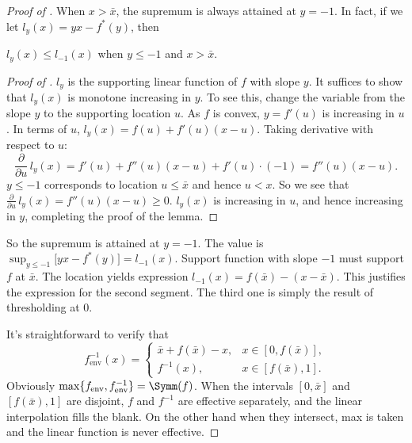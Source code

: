 \begin{proof}[Proof of ]
	When $x>\bar{x}$, the supremum is always attained at $y=-1$. In fact, if we let $l_y(x) = y x-f^*(y)$, then
	\begin{lemma} \label{lem:ning}
	 	$l_y(x)\leqslant l_{-1}(x)$ when $y\leqslant -1$ and $x>\bar{x}$.
	\end{lemma}
	\begin{proof}[Proof of ]
	$l_y$ is the supporting linear function of $f$ with slope $y$. It suffices to show that $l_y(x)$ is monotone increasing in $y$. To see this, change the variable from the slope $y$ to the supporting location $u$. As $f$ is convex, $y=f'(u)$ is increasing in $u$. In terms of $u$, $l_y(x) = f(u) + f'(u)(x-u)$. Taking derivative with respect to $u$:
	\[\frac{\partial}{\partial u }\, l_y(x) = f'(u) + f''(u)(x-u) + f'(u)\cdot(-1) = f''(u)(x-u).\]
	$y\leqslant -1$ corresponds to location $u\leqslant \bar{x}$ and hence $u<x$. So we see that $\frac{\partial}{\partial u }\, l_y(x)= f''(u)(x-u) \geqslant 0$. $l_y(x)$ is increasing in $u$, and hence increasing in $y$, completing the proof of the lemma.
	\end{proof}
	So the supremum is attained at $y=-1$. The value is $\sup_{y\leqslant -1}\big[yx-f^*(y)\big] = l_{-1}(x)$. Support function with slope $-1$ must support $f$ at $\bar{x}$.
	The location yields expression $l_{-1}(x) = f(\bar{x}) - (x-\bar{x})$. This justifies the expression for the second segment. The third one is simply the result of thresholding at 0.

	It's straightforward to verify that
	\[
		f_\mathrm{env}^{-1}(x) =
		\left\{
		\begin{array}{ll}
		\bar{x}+f(\bar{x})-x,&x\in[0,f(\bar{x})], \\
		f^{-1}(x), & x\in[f(\bar{x}),1].
		\end{array}
		\right.
	\]
	Obviously $\max\{{f}_\mathrm{env},{f}_\mathrm{env}^{-1}\}=\Symm(f)$. When the intervals $[0,\bar{x}]$ and $[f(\bar{x}),1]$ are disjoint, $f$ and $f^{-1}$ are effective separately, and the linear interpolation fills the blank. On the other hand when they intersect, max is taken and the linear function is never effective.
\end{proof}




% 

